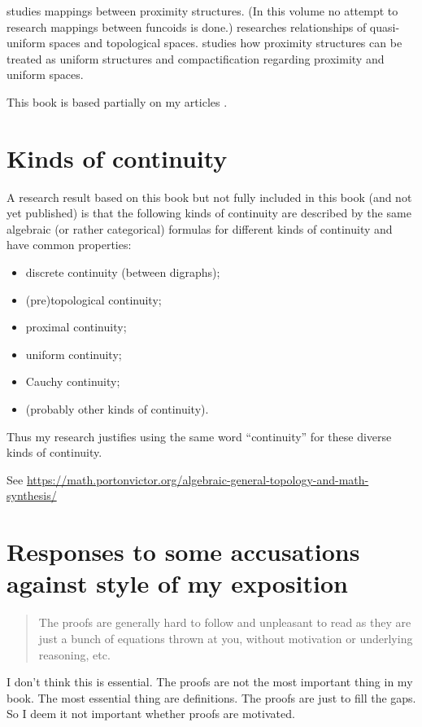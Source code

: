 \cite{mapping-prox} studies mappings between proximity structures.
(In this volume no attempt to research mappings between funcoids is
done.) \cite{quasi-unif-top} researches relationships of quasi-uniform
spaces and topological spaces. \cite{eq-prox-totbound-unif} studies
how proximity structures can be treated as uniform structures and
compactification regarding proximity and uniform spaces.

This book is based partially on my articles \cite{filters,funcoidsreloids,pointfree}.


\section{Kinds of continuity}

A research result based on this book but not fully included in this
book (and not yet published) is that the following kinds of continuity
are described by the same algebraic (or rather categorical) formulas
for different kinds of continuity and have common properties:
\begin{itemize}
\item discrete continuity (between digraphs);
\item (pre)topological continuity;
\item proximal continuity;
\item uniform continuity;
\item Cauchy continuity;
\item (probably other kinds of continuity).
\end{itemize}
Thus my research justifies using the same word ``continuity'' for
these diverse kinds of continuity.

See \url{https://math.portonvictor.org/algebraic-general-topology-and-math-synthesis/}

\section{Responses to some accusations against style of my exposition}

\begin{quote}
The proofs are generally hard to follow and unpleasant to read as they are just a bunch of equations thrown at you, without motivation or underlying reasoning, etc.
\end{quote}

I don't think this is essential. The proofs are not the most important thing in my book. The most essential thing are definitions. The proofs are just to fill the gaps. So I deem it not important whether proofs are motivated.

